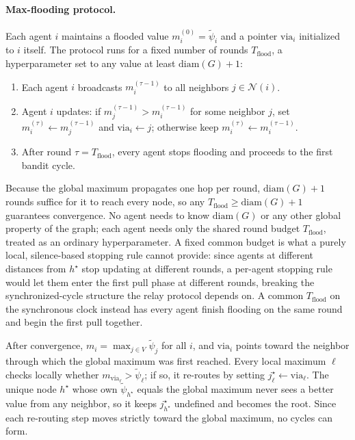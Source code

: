 \documentclass{article}
\begin{document}
\paragraph{Max-flooding protocol.}
Each agent $i$ maintains a flooded value $m_i^{(0)} = \tilde{\psi}_i$ and a pointer $\mathrm{via}_i$ initialized to $i$ itself. The protocol runs for a fixed number of rounds $T_{\mathrm{flood}}$, a hyperparameter set to any value at least $\mathrm{diam}(G)+1$:
\begin{enumerate}
    \item Each agent $i$ broadcasts $m_i^{(\tau-1)}$ to all neighbors $j \in \mathcal{N}(i)$.
    \item Agent $i$ updates: if $m_j^{(\tau-1)} > m_i^{(\tau-1)}$ for some neighbor $j$, set $m_i^{(\tau)} \leftarrow m_j^{(\tau-1)}$ and $\mathrm{via}_i \leftarrow j$; otherwise keep $m_i^{(\tau)} \leftarrow m_i^{(\tau-1)}$.
    \item After round $\tau = T_{\mathrm{flood}}$, every agent stops flooding and proceeds to the first bandit cycle.
\end{enumerate}
Because the global maximum propagates one hop per round, $\mathrm{diam}(G)+1$ rounds suffice for it to reach every node, so any $T_{\mathrm{flood}} \geq \mathrm{diam}(G)+1$ guarantees convergence. No agent needs to know $\mathrm{diam}(G)$ or any other global property of the graph; each agent needs only the shared round budget $T_{\mathrm{flood}}$, treated as an ordinary hyperparameter. A fixed common budget is what a purely local, silence-based stopping rule cannot provide: since agents at different distances from $h^\star$ stop updating at different rounds, a per-agent stopping rule would let them enter the first pull phase at different rounds, breaking the synchronized-cycle structure the relay protocol depends on. A common $T_{\mathrm{flood}}$ on the synchronous clock instead has every agent finish flooding on the same round and begin the first pull together.

After convergence, $m_i = \max_{j \in V} \tilde{\psi}_j$ for all $i$, and $\mathrm{via}_i$ points toward the neighbor through which the global maximum was first reached. Every local maximum $\ell$ checks locally whether $m_{\mathrm{via}_\ell} > \tilde{\psi}_\ell$; if so, it re-routes by setting $j_\ell^\star \leftarrow \mathrm{via}_\ell$. The unique node $h^\star$ whose own $\tilde{\psi}_{h^\star}$ equals the global maximum never sees a better value from any neighbor, so it keeps $j_{h^\star}^\star$ undefined and becomes the root. Since each re-routing step moves strictly toward the global maximum, no cycles can form.
\end{document}
